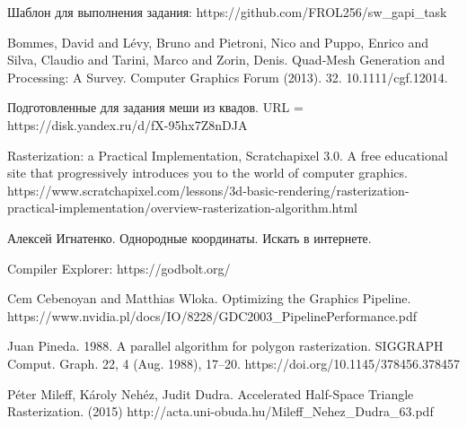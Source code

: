 \documentclass[12pt,subf,href,colorlinks=true]{article}
\begin{document}
\begin{thebibliography}{9} 
	
 Шаблон для выполнения задания: https://github.com/FROL256/sw\_gapi\_task 

 Bommes, David and Lévy, Bruno and Pietroni, Nico and Puppo, Enrico and Silva, Claudio and Tarini, Marco and Zorin, Denis. Quad‐Mesh Generation and Processing: A Survey. Computer Graphics Forum (2013). 32. 10.1111/cgf.12014. 

 Подготовленные для задания меши из квадов. \newline URL = https://disk.yandex.ru/d/fX-95hx7Z8nDJA 

 Rasterization: a Practical Implementation, Scratchapixel 3.0. A free educational site that progressively introduces you to the world of computer graphics. https://www.scratchapixel.com/lessons/3d-basic-rendering/rasterization-practical-implementation/overview-rasterization-algorithm.html

 Алексей Игнатенко. Однородные координаты. Искать в интернете.

 Compiler Explorer: https://godbolt.org/

 Cem Cebenoyan and Matthias Wloka. Optimizing the Graphics Pipeline. https://www.nvidia.pl/docs/IO/8228/GDC2003\_PipelinePerformance.pdf

 Juan Pineda. 1988. A parallel algorithm for polygon rasterization. SIGGRAPH Comput. Graph. 22, 4 (Aug. 1988), 17–20. https://doi.org/10.1145/378456.378457

 Péter Mileff, Károly Nehéz, Judit Dudra.  Accelerated Half-Space Triangle Rasterization. (2015) http://acta.uni-obuda.hu/Mileff\_Nehez\_Dudra\_63.pdf

\end{thebibliography} 
\end{document}
